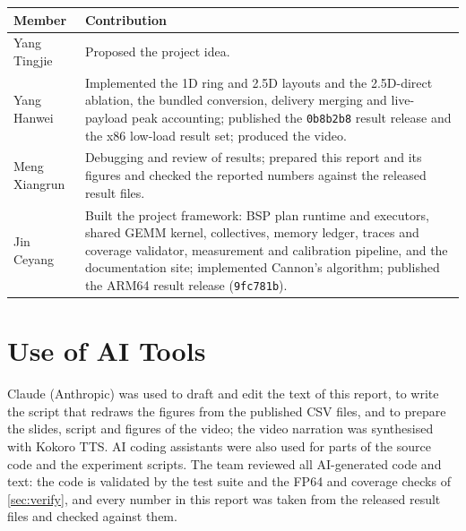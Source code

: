 \documentclass[11pt,a4paper]{article}
\newcommand{\code}[1]{\texttt{#1}}
\begin{document}
\begin{center}
\small
\begin{tabularx}{\textwidth}{@{}l X@{}}
\toprule
Member & Contribution \\
\midrule
Yang Tingjie   & Proposed the project idea. \\
Yang Hanwei    & Implemented the 1D ring and 2.5D layouts and the 2.5D-direct ablation, the bundled conversion,
                 delivery merging and live-payload peak accounting; published the \code{0b8b2b8} result release and
                 the x86 low-load result set; produced the video. \\
Meng Xiangrun  & Debugging and review of results; prepared this report and its figures and checked the reported
                 numbers against the released result files. \\
Jin Ceyang     & Built the project framework: BSP plan runtime and executors, shared GEMM kernel, collectives,
                 memory ledger, traces and coverage validator, measurement and calibration pipeline, and the
                 documentation site; implemented Cannon's algorithm; published the ARM64 result release
                 (\code{9fc781b}). \\
\bottomrule
\end{tabularx}
\end{center}

\section*{Use of AI Tools}

Claude (Anthropic) was used to draft and edit the text of this report, to write the script that redraws
the figures from the published CSV files, and to prepare the slides, script and figures of the video; the
video narration was synthesised with Kokoro TTS. AI coding assistants were also used for parts of the
source code and the experiment scripts. The team reviewed all AI-generated code and text: the code is
validated by the test suite and the FP64 and coverage checks of \cref{sec:verify}, and every number in
this report was taken from the released result files and checked against them.
\end{document}
